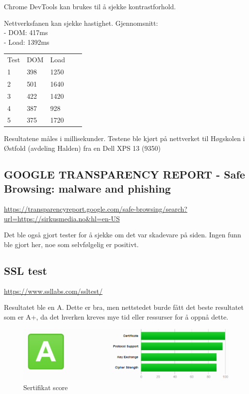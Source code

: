 Chrome DevTools kan brukes til å sjekke kontrastforhold.

Nettverksfanen kan sjekke hastighet.
Gjennomsnitt:\\
- DOM: 417ms\\
- Load: 1392ms

\begin{table}[H]
\begin{tabular}{lllll}
Test & DOM & Load &  &  \\
1 & 398 & 1250 &  &  \\
2 & 501 & 1640 &  &  \\
3 & 422 & 1420 &  &  \\
4 & 387 &  928 &  &  \\
5 & 375 & 1720 &  & 
\end{tabular}
\end{table}

Resultatene måles i millisekunder. Testene ble kjørt på nettverket til Høgskolen i Østfold (avdeling Halden) fra en Dell XPS 13 (9350)

\subsection{GOOGLE TRANSPARENCY REPORT - Safe Browsing: malware and phishing}
\url{https://transparencyreport.google.com/safe-browsing/search?url=https://sirkusmedia.no&hl=en-US}

Det ble også gjort tester for å sjekke om det var skadevare på siden.
Ingen funn ble gjort her, noe som selvfølgelig er positivt.

\subsection{SSL test}

\url{https://www.ssllabs.com/ssltest/}

Resultatet ble en A. Dette er bra, men nettstedet burde fått det beste resultatet som er A+, da det hverken kreves mye tid eller ressurser for å oppnå dette.

\begin{figure}[H]
    \centering
    \includegraphics[width=\textwidth]{bjornar/ssllabs.png}
    \caption{Sertifikat score}
    \label{fig:analysis-current-ssl}
\end{figure}


\clearpage